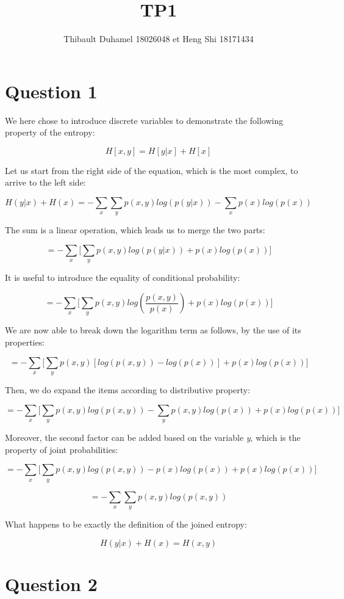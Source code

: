 \documentclass{article}
\title{TP1}
\author{Thibault Duhamel 18026048 et Heng Shi 18171434 }
\begin{document}
\maketitle

\section*{Question 1}

We here chose to introduce discrete variables to demonstrate the following property of the entropy:

$$H[x,y] = H[y|x] + H[x]$$

Let us start from the right side of the equation, which is the most complex, to arrive to the left side:

$$H(y|x) + H(x) = - \sum_{x}{\sum_{y}{p(x,y)log(p(y|x))}} - \sum_{x}{p(x)log(p(x))}$$

The sum is a linear operation, which leads us to merge the two parts:

$$ = - \sum_{x}{\Big[\sum_{y}{p(x,y)log(p(y|x))} + p(x)log(p(x))\Big]}$$

It is useful to introduce the equality of conditional probability:

$$ = - \sum_{x}{\Big[\sum_{y}{p(x,y)log(\frac{p(x,y)}{p(x)})} + p(x)log(p(x))\Big]}$$

We are now able to break down the logarithm term as follows, by the use of its properties:

$$ = - \sum_{x}{\Big[\sum_{y}{p(x,y)[log(p(x,y))-log(p(x))]} + p(x)log(p(x))\Big]}$$

Then, we do expand the items according to distributive property:

$$ = - \sum_{x}{\Big[\sum_{y}{p(x,y)log(p(x,y))}-\sum_{y}{p(x,y)log(p(x))} + p(x)log(p(x))\Big]}$$

Moreover, the second factor can be added based on the variable \textit {y}, which is the property of joint probabilities:

$$ = - \sum_{x}{\Big[\sum_{y}{p(x,y)log(p(x,y))}-p(x)log(p(x)) + p(x)log(p(x))\Big]}$$

$$ = - \sum_{x}{\sum_{y}{p(x,y)log(p(x,y))}}$$

What happens to be exactly the definition of the joined entropy:

$$\boxed{H(y|x) + H(x) = H(x,y)}$$



\section*{Question 2}
\end{document}
